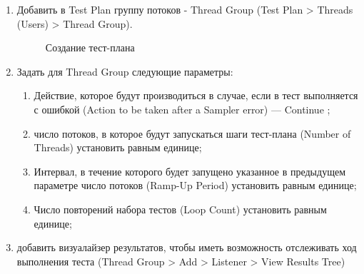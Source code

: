 \begin{enumerate}
\item Добавить в Test Plan группу потоков - Thread Group (Test Plan > Threads (Users) > Thread Group).

\begin{figure}[ht]
\caption{Создание тест-плана}
\label{ris:testplan.png}
\end{figure}

\item Задать для Thread Group следующие параметры:

\begin{enumerate}
\item Действие, которое будут производиться в случае, если в тест выполняется с ошибкой
(Action to be taken after a Sampler error) --- Continue ;
\item число потоков, в которое будут запускаться шаги тест-плана (Number of Threads) установить равным единице;
\item Интервал, в течение которого будет запущено указанное в предыдущем параметре
число потоков (Ramp-Up Period) установить равным единице;
\item Число повторений набора тестов (Loop Count) установить равным единице;
\end{enumerate}

\item добавить визуалайзер результатов, чтобы иметь возможность отслеживать ход выполнения теста (Thread Group >
Add > Listener > View Results Tree)
\end{enumerate}

